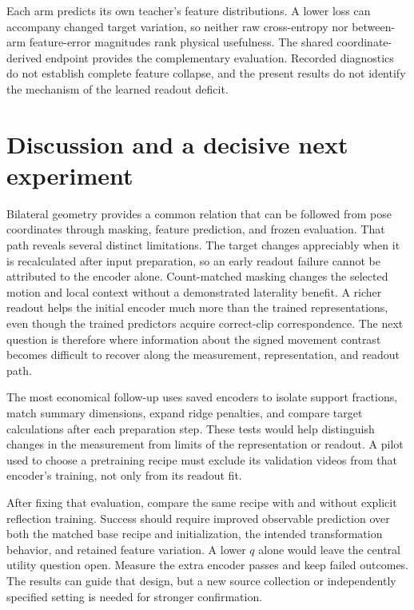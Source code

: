 \documentclass{article}
\begin{document}
Each arm predicts its own teacher's feature distributions. A lower loss can accompany changed target variation, so neither raw cross-entropy nor between-arm feature-error magnitudes rank physical usefulness. The shared coordinate-derived endpoint provides the complementary evaluation. Recorded diagnostics do not establish complete feature collapse, and the present results do not identify the mechanism of the learned readout deficit.

\section{Discussion and a decisive next experiment}\label{discussion-and-a-decisive-next-experiment}

Bilateral geometry provides a common relation that can be followed from pose coordinates through masking, feature prediction, and frozen evaluation. That path reveals several distinct limitations. The target changes appreciably when it is recalculated after input preparation, so an early readout failure cannot be attributed to the encoder alone. Count-matched masking changes the selected motion and local context without a demonstrated laterality benefit. A richer readout helps the initial encoder much more than the trained representations, even though the trained predictors acquire correct-clip correspondence. The next question is therefore where information about the signed movement contrast becomes difficult to recover along the measurement, representation, and readout path.

The most economical follow-up uses saved encoders to isolate support fractions, match summary dimensions, expand ridge penalties, and compare target calculations after each preparation step. These tests would help distinguish changes in the measurement from limits of the representation or readout. A pilot used to choose a pretraining recipe must exclude its validation videos from that encoder's training, not only from its readout fit.

After fixing that evaluation, compare the same recipe with and without explicit reflection training. Success should require improved observable prediction over both the matched base recipe and initialization, the intended transformation behavior, and retained feature variation. A lower \(q\) alone would leave the central utility question open. Measure the extra encoder passes and keep failed outcomes. The results can guide that design, but a new source collection or independently specified setting is needed for stronger confirmation.
\end{document}

